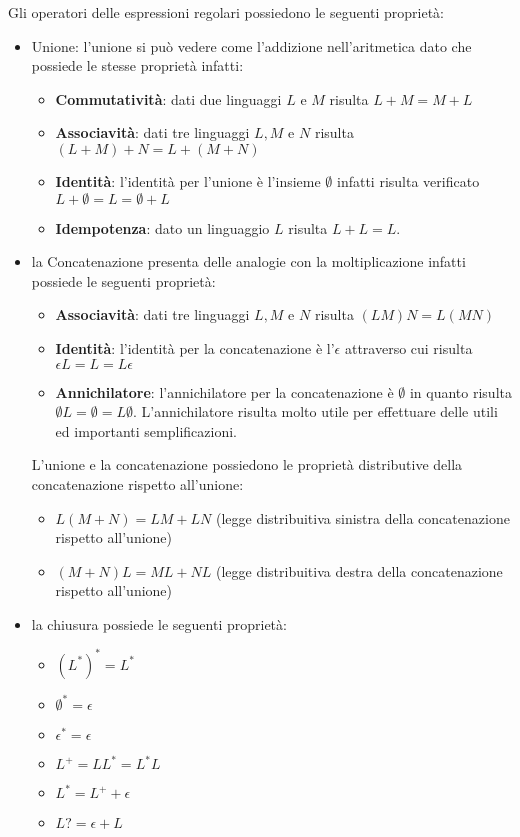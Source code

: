 \documentclass[a4paper]{book}
\theoremstyle{definition}%
\begin{document}
Gli operatori delle espressioni regolari possiedono le seguenti proprietà:
\begin{itemize}
  \item Unione: l'unione si può vedere come l'addizione nell'aritmetica dato che possiede le stesse proprietà infatti:
    \begin{itemize}
      \item \textbf{Commutatività}: dati due linguaggi $L$ e $M$ risulta $L + M = M + L$
      \item \textbf{Associavità}: dati tre linguaggi $L, M$ e $N$ risulta $(L + M) + N = L + (M + N)$
      \item \textbf{Identità}: l'identità per l'unione è l'insieme $\emptyset$ infatti risulta verificato $L + \emptyset = L = \emptyset + L$
      \item \textbf{Idempotenza}: dato un linguaggio $L$ risulta $L + L = L$.
      \end{itemize}

  \item la Concatenazione presenta delle analogie con la moltiplicazione infatti possiede le seguenti proprietà:
    \begin{itemize}
      \item \textbf{Associavità}: dati tre linguaggi $L, M$ e $N$ risulta $(LM)N = L(MN)$
      \item \textbf{Identità}: l'identità per la concatenazione è l'$\epsilon$ attraverso cui risulta $\epsilon L = L = L \epsilon$
      \item \textbf{Annichilatore}: l'annichilatore per la concatenazione è $\emptyset$ in quanto risulta $\emptyset L = \emptyset = L \emptyset$.
                                    L'annichilatore risulta molto utile per effettuare delle utili ed importanti semplificazioni.
    \end{itemize}
  L'unione e la concatenazione possiedono le proprietà distributive della concatenazione rispetto all'unione:
  \begin{itemize}
    \item $L(M + N) = LM + LN$ \quad (legge distribuitiva sinistra della concatenazione rispetto all'unione)
    \item $(M + N)L = ML + NL$ \quad (legge distribuitiva destra della concatenazione rispetto all'unione)
  \end{itemize}

  \item la chiusura possiede le seguenti proprietà:
  \begin{itemize}
  \item $(L^*)^* = L^*$
  \item $\emptyset ^ * = \epsilon$
  \item $\epsilon ^ * = \epsilon$
  \item $L^+ = LL^* = L^* L$
  \item $L^* = L^+ + \epsilon$
  \item $L? = \epsilon + L$
  \end{itemize}
\end{itemize}
\end{document}
